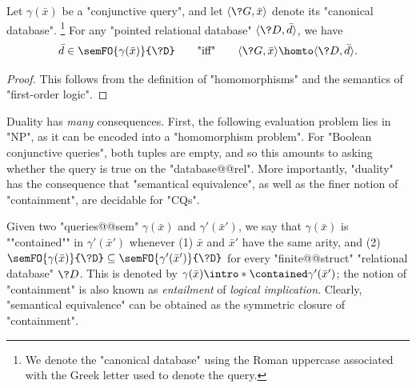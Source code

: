 \begin{proposition}[""Duality""]
	\AP\label{prop:duality}
	Let $\gamma(\bar x)$ be a "conjunctive query",
	and let $\tup{\?G, \bar x}$ denote its "canonical database".%
	\footnote{We denote the "canonical database" using the Roman
	uppercase associated with the Greek letter used to denote
	the query.}
	For any "pointed relational database" $\tup{\?D, \bar d}$,
	we have
	\[
		\bar d \in \semFO{\gamma(\bar x)}{\?D}
		\qquad\text{"iff"}\qquad
		\tup{\?G, \bar x} \homto \tup{\?D, \bar d}.
	\]
\end{proposition}


\begin{proof}
	This follows from the definition of "homomorphisms" and
	the semantics of "first-order logic".
\end{proof}

Duality has \emph{many} consequences. First, the following evaluation problem
lies in "NP", as it can be encoded into a "homomorphism problem".
For "Boolean conjunctive queries", both tuples are empty, and so
this amounts to asking whether the query is true on the "database@@rel".
More importantly, "duality" has the consequence that
"semantical equivalence", as well as the finer notion of "containment",
are decidable for "CQs".

Given two "queries@@sem" $\gamma(\bar x)$ and $\gamma'(\bar x')$,
we say that $\gamma(\bar x)$ is ""contained"" in $\gamma'(\bar x')$
whenever (1) $\bar x$ and $\bar x'$ have the same arity, and (2)
$\semFO{\gamma(\bar x)}{\?D} \subseteq \semFO{\gamma'(\bar x')}{\?D}$
for every "finite@@struct" "relational database" $\?D$. This is denoted by
$\gamma(\bar x) \intro*\contained \gamma'(\bar x')$; the notion
of "containment" is also known as \emph{entailment} of \emph{logical implication}.
Clearly, "semantical equivalence" can be obtained as the symmetric
closure of "containment".

